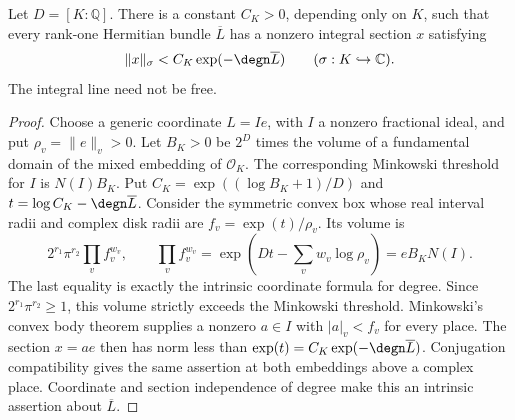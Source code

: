 \begin{lemma}
\label{lem:short-hermitian-line}
\leanok
Let $D=[K:\mathbb Q]$. There is a constant $C_K>0$, depending only on
$K$, such that every rank-one Hermitian bundle $\overline L$ has a
nonzero integral section $x$ satisfying
\[
 \|x\|_\sigma<C_K\exp(-\degn\overline L)
 \qquad(\sigma:K\hookrightarrow\mathbb C).
\]
The integral line need not be free.
\end{lemma}
\begin{proof}
Choose a generic coordinate $L=Ie$, with $I$ a nonzero fractional ideal,
and put $\rho_v=\|e\|_v>0$. Let $B_K>0$ be $2^D$ times the volume
of a fundamental domain of the mixed embedding of $\mathcal O_K$.
The corresponding Minkowski threshold for $I$ is $N(I)B_K$.
Put $C_K=\exp((\log B_K+1)/D)$ and
$t=\log C_K-\degn\overline L$. Consider the symmetric convex box
whose real interval radii and complex disk radii are
$f_v=\exp(t)/\rho_v$. Its volume is
\[
 2^{r_1}\pi^{r_2}\prod_v f_v^{w_v},\qquad
 \prod_v f_v^{w_v}
 =\exp(Dt-\textstyle\sum_v w_v\log\rho_v)
 =eB_KN(I).
\]
The last equality is exactly the intrinsic coordinate formula for degree.
Since $2^{r_1}\pi^{r_2}\geq1$, this volume strictly exceeds the
Minkowski threshold. Minkowski's convex body theorem supplies a nonzero
$a\in I$ with $|a|_v<f_v$ for every place. The section $x=ae$ then
has norm less than $\exp(t)=C_K\exp(-\degn\overline L)$.
Conjugation compatibility gives the same assertion at both embeddings
above a complex place. Coordinate and section independence of degree
make this an intrinsic assertion about $\overline L$.
\end{proof}



